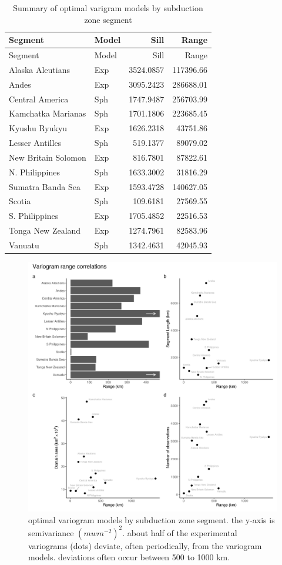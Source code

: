 \documentclass[draft,linenumbers]{agujournal2018}
\begin{document}
\hypertarget{tbl:variogram.summary.table}{}
\begin{longtable}[]{@{}llrr@{}}
\caption{\label{tbl:variogram.summary.table}Summary of optimal varigram
models by subduction zone segment}\tabularnewline
\toprule
Segment & Model & Sill & Range \\
\midrule
\endfirsthead
\toprule
Segment & Model & Sill & Range \\
\midrule
\endhead
Alaska Aleutians & Exp & 3524.0857 & 117396.66 \\
Andes & Exp & 3095.2423 & 286688.01 \\
Central America & Sph & 1747.9487 & 256703.99 \\
Kamchatka Marianas & Sph & 1701.1806 & 223685.45 \\
Kyushu Ryukyu & Exp & 1626.2318 & 43751.86 \\
Lesser Antilles & Sph & 519.1377 & 89079.02 \\
New Britain Solomon & Exp & 816.7801 & 87822.61 \\
N. Philippines & Sph & 1633.3002 & 31816.29 \\
Sumatra Banda Sea & Exp & 1593.4728 & 140627.05 \\
Scotia & Sph & 109.6181 & 27569.55 \\
S. Philippines & Exp & 1705.4852 & 22516.53 \\
Tonga New Zealand & Exp & 1274.7961 & 82583.96 \\
Vanuatu & Sph & 1342.4631 & 42045.93 \\
\bottomrule
\end{longtable}

\begin{figure}[h]

{\centering \includegraphics[width=0.8\linewidth,]{../figs/summary/variogram_summary} 

}

\caption{optimal variogram models by subduction zone segment. the y-axis is semivariance $(mwm^{-2})^2$. about half of the experimental variograms (dots) deviate, often periodically, from the variogram models. deviations often occur between 500 to 1000 km.}\label{fig:variogram.summary.plot}
\end{figure}
\end{document}
